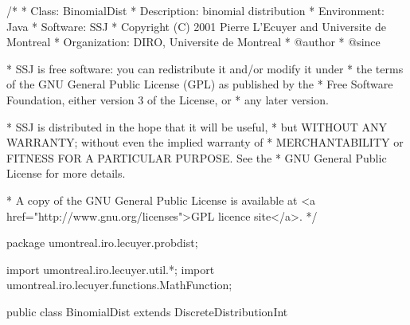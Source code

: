 \begin{code}
\begin{hide}
/*
 * Class:        BinomialDist
 * Description:  binomial distribution
 * Environment:  Java
 * Software:     SSJ 
 * Copyright (C) 2001  Pierre L'Ecuyer and Universite de Montreal
 * Organization: DIRO, Universite de Montreal
 * @author       
 * @since

 * SSJ is free software: you can redistribute it and/or modify it under
 * the terms of the GNU General Public License (GPL) as published by the
 * Free Software Foundation, either version 3 of the License, or
 * any later version.

 * SSJ is distributed in the hope that it will be useful,
 * but WITHOUT ANY WARRANTY; without even the implied warranty of
 * MERCHANTABILITY or FITNESS FOR A PARTICULAR PURPOSE.  See the
 * GNU General Public License for more details.

 * A copy of the GNU General Public License is available at
   <a href="http://www.gnu.org/licenses">GPL licence site</a>.
 */
\end{hide}
package umontreal.iro.lecuyer.probdist;
\begin{hide}
import umontreal.iro.lecuyer.util.*;
import umontreal.iro.lecuyer.functions.MathFunction;
\end{hide}

public class BinomialDist extends DiscreteDistributionInt\begin{hide} {
   private int n;
   private double p;
   private double q;
   private static final double EPS2 = 100.0*EPSILON;

   private static class Function implements MathFunction {
      protected int m;
      protected int R;
      protected double mean;
      protected int f[];

      public Function (int m, double mean, int R, int f[]) {
         this.m = m;
         this.mean = mean;
         this.R = R;
         this.f = new int[f.length];
         System.arraycopy (f, 0, this.f, 0, f.length);
      }


      public double evaluate (double x) {
         if (x < R)
            return 1e100;

         double sum = 0.0;
         for (int j = 0; j < R; j++)
            sum += f[j] / (x - (double) j);

         return (sum + m * Math.log1p (-mean / x));
      }
   }
\end{hide}
\end{code}
